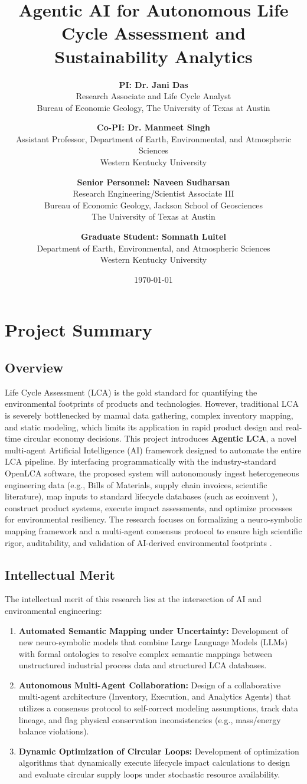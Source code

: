 \documentclass[11pt]{article}
\title{\textbf{Agentic AI for Autonomous Life Cycle Assessment and Sustainability Analytics}}
\author{
    \textbf{PI: Dr. Jani Das} \\
    Research Associate and Life Cycle Analyst \\
    Bureau of Economic Geology, The University of Texas at Austin \\
    \and
    \textbf{Co-PI: Dr. Manmeet Singh} \\
    Assistant Professor, Department of Earth, Environmental, and Atmospheric Sciences \\
    Western Kentucky University \\
    \and
    \textbf{Senior Personnel: Naveen Sudharsan} \\
    Research Engineering/Scientist Associate III \\
    Bureau of Economic Geology, Jackson School of Geosciences \\
    The University of Texas at Austin \\
    \and
    \textbf{Graduate Student: Somnath Luitel} \\
    Department of Earth, Environmental, and Atmospheric Sciences \\
    Western Kentucky University
}
\date{\today}
\begin{document}
\maketitle

\newpage
\tableofcontents
\newpage

\section{Project Summary}
\subsection{Overview}
Life Cycle Assessment (LCA) is the gold standard for quantifying the environmental footprints of products and technologies. However, traditional LCA is severely bottlenecked by manual data gathering, complex inventory mapping, and static modeling, which limits its application in rapid product design and real-time circular economy decisions. This project introduces \textbf{Agentic LCA}, a novel multi-agent Artificial Intelligence (AI) framework designed to automate the entire LCA pipeline. By interfacing programmatically with the industry-standard OpenLCA software, the proposed system will autonomously ingest heterogeneous engineering data (e.g., Bills of Materials, supply chain invoices, scientific literature), map inputs to standard lifecycle databases (such as ecoinvent \cite{ecoinvent}), construct product systems, execute impact assessments, and optimize processes for environmental resiliency. The research focuses on formalizing a neuro-symbolic mapping framework and a multi-agent consensus protocol to ensure high scientific rigor, auditability, and validation of AI-derived environmental footprints \cite{nwagwu2025, mensikova2026}.

\subsection{Intellectual Merit}
The intellectual merit of this research lies at the intersection of AI and environmental engineering:
\begin{enumerate}
    \item \textbf{Automated Semantic Mapping under Uncertainty:} Development of new neuro-symbolic models that combine Large Language Models (LLMs) with formal ontologies to resolve complex semantic mappings between unstructured industrial process data and structured LCA databases.
    \item \textbf{Autonomous Multi-Agent Collaboration:} Design of a collaborative multi-agent architecture (Inventory, Execution, and Analytics Agents) that utilizes a consensus protocol to self-correct modeling assumptions, track data lineage, and flag physical conservation inconsistencies (e.g., mass/energy balance violations).
    \item \textbf{Dynamic Optimization of Circular Loops:} Development of optimization algorithms that dynamically execute lifecycle impact calculations to design and evaluate circular supply loops under stochastic resource availability.
\end{enumerate}
\end{document}

